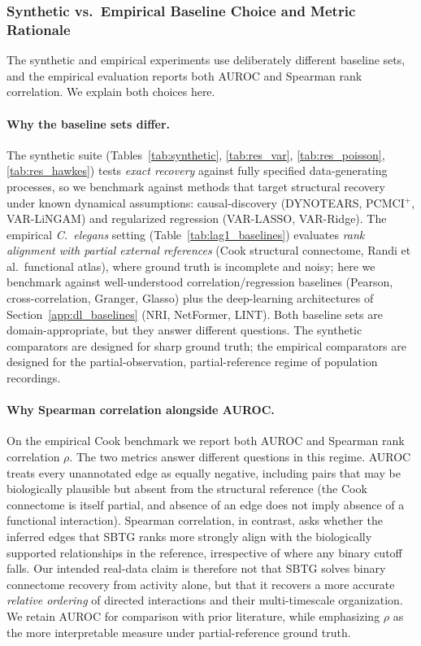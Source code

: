 \documentclass{article}
\theoremstyle{plain}
\theoremstyle{definition}
\theoremstyle{remark}
\newcommand{\1}{\mathbf{1}}
\begin{document}
\subsubsection{Synthetic vs.\ Empirical Baseline Choice and Metric Rationale}
\label{app:baseline_choice}

The synthetic and empirical experiments use deliberately different baseline sets, and the empirical evaluation reports both AUROC and Spearman rank correlation. We explain both choices here.

\paragraph{Why the baseline sets differ.}
The synthetic suite (Tables~\ref{tab:synthetic}, \ref{tab:res_var}, \ref{tab:res_poisson}, \ref{tab:res_hawkes}) tests \emph{exact recovery} against fully specified data-generating processes, so we benchmark against methods that target structural recovery under known dynamical assumptions: causal-discovery (DYNOTEARS, PCMCI$^+$, VAR-LiNGAM) and regularized regression (VAR-LASSO, VAR-Ridge). The empirical \emph{C.~elegans} setting (Table~\ref{tab:lag1_baselines}) evaluates \emph{rank alignment with partial external references} (Cook structural connectome, Randi et al.\ functional atlas), where ground truth is incomplete and noisy; here we benchmark against well-understood correlation/regression baselines (Pearson, cross-correlation, Granger, Glasso) plus the deep-learning architectures of Section~\ref{app:dl_baselines} (NRI, NetFormer, LINT). Both baseline sets are domain-appropriate, but they answer different questions. The synthetic comparators are designed for sharp ground truth; the empirical comparators are designed for the partial-observation, partial-reference regime of population recordings.

\paragraph{Why Spearman correlation alongside AUROC.}
\label{app:spearman_rationale}
On the empirical Cook benchmark we report both AUROC and Spearman rank correlation $\rho$. The two metrics answer different questions in this regime. AUROC treats every unannotated edge as equally negative, including pairs that may be biologically plausible but absent from the structural reference (the Cook connectome is itself partial, and absence of an edge does not imply absence of a functional interaction). Spearman correlation, in contrast, asks whether the inferred edges that SBTG ranks more strongly align with the biologically supported relationships in the reference, irrespective of where any binary cutoff falls. Our intended real-data claim is therefore not that SBTG solves binary connectome recovery from activity alone, but that it recovers a more accurate \emph{relative ordering} of directed interactions and their multi-timescale organization. We retain AUROC for comparison with prior literature, while emphasizing $\rho$ as the more interpretable measure under partial-reference ground truth.
\end{document}
